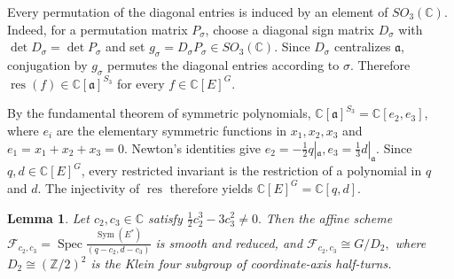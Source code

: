 \documentclass[12pt,leqno]{amsart}
\numberwithin{equation}{section} \newtheorem{thm}{Theorem}[section] \newtheorem{lem}[thm]{Lemma} \newtheorem{ex}[thm]{Example} \newtheorem{prop}[thm]{Proposition} \newtheorem{cor}[thm]{Corollary} \newtheorem{defi}[thm]{Definition} \newtheorem{rmk}[thm]{Remark} \newtheorem{notation}[thm]{Notation}
\newcommand{\Sym}{\operatorname{Sym}}
\newcommand{\Spec}{\operatorname{Spec}}
\def\Z{\mathbb{Z}} \def\N{\mathbb{N}} \def\A{\mathbb{A}} \def\C{\mathbb{C}} \def\R{\mathbb{R}} \def\Q{\mathbb{Q}} \def\F{\mathbb{F}}
\begin{document}
Every permutation of the diagonal entries is induced by an element of $SO_3(\C)$. Indeed, for a permutation matrix $P_\sigma$, choose a diagonal sign matrix $D_\sigma$ with $\det D_\sigma=\det P_\sigma$ and set $g_\sigma=D_\sigma P_\sigma\in SO_3(\C)$. Since $D_\sigma$ centralizes $\mathfrak a$, conjugation by $g_\sigma$ permutes the diagonal entries according to $\sigma$. Therefore \(\operatorname{res}(f)\in\C[\mathfrak a]^{S_3}\) for every $f\in\C[E]^G$.

By the fundamental theorem of symmetric polynomials, \(\C[\mathfrak a]^{S_3}=\C[e_2,e_3]\), where $e_i$ are the elementary symmetric functions in $x_1,x_2,x_3$ and $e_1=x_1+x_2+x_3=0$. Newton's identities give \(e_2=-\frac12q|_{\mathfrak a}, e_3=\frac13d|_{\mathfrak a}\). Since $q,d\in\C[E]^G$, every restricted invariant is the restriction of a polynomial in $q$ and $d$. The injectivity of $\operatorname{res}$ therefore yields \(\C[E]^G=\C[q,d].\)

\begin{lem}\label{lem:regular-fiber}
Let $c_2,c_3\in\C$ satisfy \(\frac12c_2^3-3c_3^2\ne0.\) Then the affine scheme \(\mathcal F_{c_2,c_3} =\Spec\frac{\Sym(E^*)}{(q-c_2,d-c_3)}\) is smooth and reduced, and \(\mathcal F_{c_2,c_3}\cong G/D_2,\) where $D_2\cong(\Z/2)^2$ is the Klein four subgroup of coordinate-axis half-turns.
\end{lem}
\end{document}

